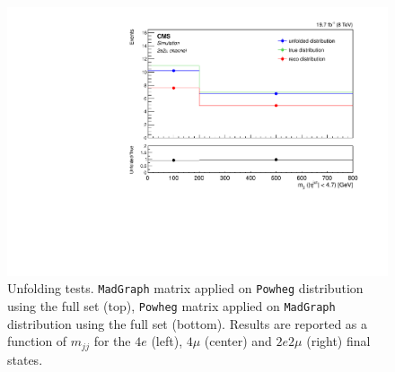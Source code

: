 \begin{figure}[hbtp]
\begin{center}
    \includegraphics[width=0.8\cmsFigWidth]{Figures/Unfolding/MCTests/Mjj_ZZTo2e2m_PowMatrix_MadDistr_FullSample_fr}  
 \caption{Unfolding tests. \texttt{MadGraph} matrix applied on \texttt{Powheg} distribution using the full set (top), \texttt{Powheg} matrix applied on \texttt{MadGraph} distribution using the full set (bottom). Results are reported as a function of $m_{jj}$ for the $4e$ (left), $4\mu$ (center) and $2e2\mu$ (right) final states.}
    \label{fig:MCtest_Mjj2}
  \end{center}
\end{figure}
\clearpage 
